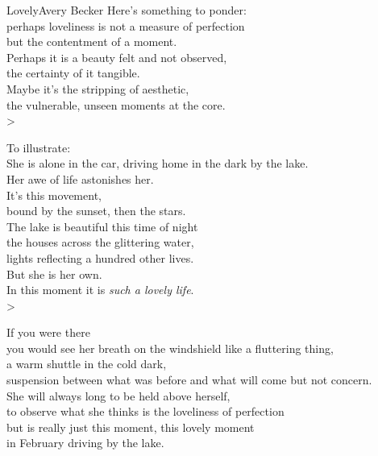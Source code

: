 \begin{poetry}{Lovely}{Avery Becker}
Here's something to ponder:\\
perhaps loveliness is not a measure of perfection\\
but the contentment of a moment.\\
Perhaps it is a beauty felt and not observed,\\
the certainty of it tangible.\\
Maybe it's the stripping of aesthetic,\\
the vulnerable, unseen moments at the core.\\>

To illustrate:\\
She is alone in the car, driving home in the dark by the lake.\\
Her awe of life astonishes her.\\
It's this movement,\\
bound by the sunset, then the stars.\\
The lake is beautiful this time of night\\
the houses across the glittering water,\\
lights reflecting a hundred other lives.\\
But she is her own.\\
In this moment it is \textit{such a lovely life}.\\>

If you were there\\
you would see her breath on the windshield like a fluttering thing,\\
a warm shuttle in the cold dark,\\
suspension between what was before and what will come but not concern.\\
She will always long to be held above herself,\\
to observe what she thinks is the loveliness of perfection\\
but is really just this moment, this lovely moment\\
in February driving by the lake.
\end{poetry}



